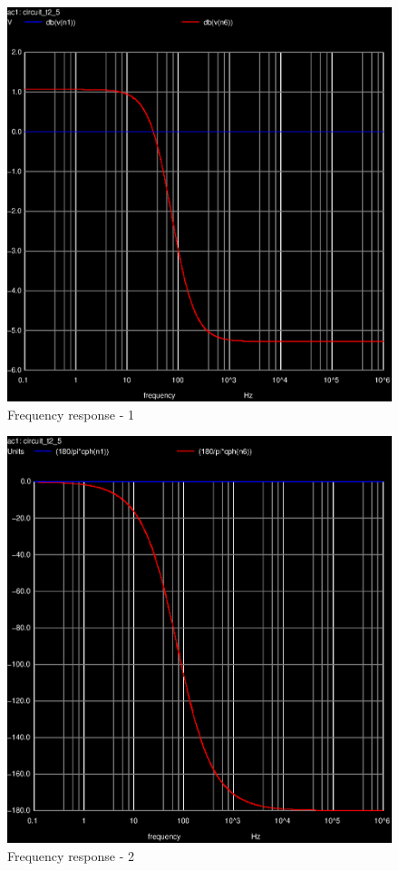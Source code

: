 \begin{figure}[ht]
	\centering
	\includegraphics[width=0.55\linewidth]{ac-1.eps}
	\caption{Frequency response - 1}
\label{fig:Dsnh_sim_t2}
\end{figure}

\begin{figure}[ht]
	\centering
	\includegraphics[width=0.55\linewidth]{ac-2.eps}
	\caption{Frequency response - 2}
\label{fig:Dsnh_sim_t2}
\end{figure}


